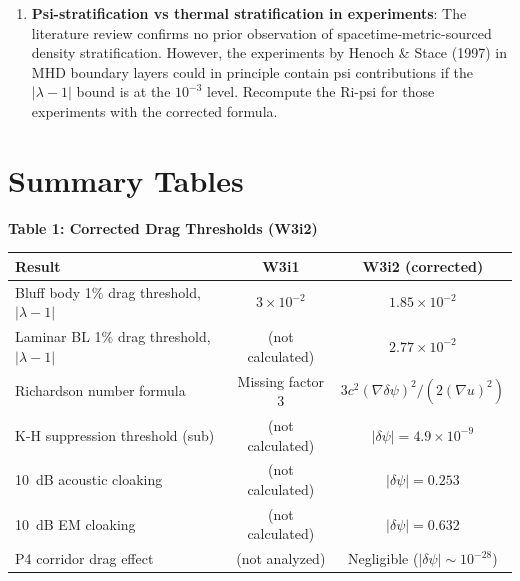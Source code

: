 \documentclass[11pt,twocolumn]{article}
\newcommand{\dpsi}{\delta\psi}
\newcommand{\lam}{\lambda}
\begin{document}
\begin{enumerate}
\item \textbf{Psi-stratification vs thermal stratification in experiments}:
  The literature review confirms no prior observation of spacetime-metric-sourced
  density stratification. However, the experiments by Henoch \& Stace (1997)
  in MHD boundary layers could in principle contain psi contributions if
  the $|\lam-1|$ bound is at the $10^{-3}$ level. Recompute the Ri-psi for
  those experiments with the corrected formula.

\end{enumerate}

\section{Summary Tables}

\begin{center}
\textbf{Table 1: Corrected Drag Thresholds (W3i2)}
\vspace{0.5em}

\begin{tabular}{@{}lcc@{}}
\toprule
\textbf{Result} & \textbf{W3i1} & \textbf{W3i2 (corrected)} \\
\midrule
Bluff body 1\% drag threshold, $|\lam-1|$ &
  $3\times10^{-2}$ & $1.85\times10^{-2}$ \\
Laminar BL 1\% drag threshold, $|\lam-1|$ &
  (not calculated) & $2.77\times10^{-2}$ \\
Richardson number formula & Missing factor 3 & $3c^2(\nabla\dpsi)^2/(2(\nabla u)^2)$ \\
K-H suppression threshold (sub) &
  (not calculated) & $|\dpsi| = 4.9\times10^{-9}$ \\
10~dB acoustic cloaking &
  (not calculated) & $|\dpsi| = 0.253$ \\
10~dB EM cloaking &
  (not calculated) & $|\dpsi| = 0.632$ \\
P4 corridor drag effect &
  (not analyzed) & Negligible ($|\dpsi| \sim 10^{-28}$) \\
\bottomrule
\end{tabular}
\end{center}

\vspace{1em}
\end{document}

